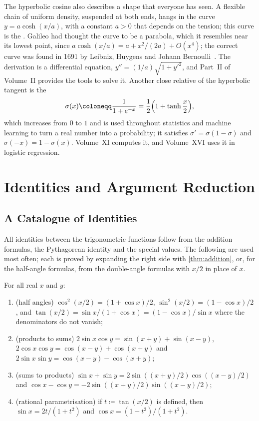 The hyperbolic cosine also describes a shape that everyone has seen. A flexible chain of uniform density, suspended at both ends, hangs in the curve $y=a\cosh(x/a)$, with a constant $a>0$ that depends on the tension; this curve is the . Galileo had thought the curve to be a parabola, which it resembles near its lowest point, since $a\cosh(x/a)=a+x^2/(2a)+O(x^4)$; the correct curve was found in 1691 by Leibniz, Huygens and Johann Bernoulli~\cite{maor1994}. The derivation is a differential equation, $y''=(1/a)\sqrt{1+y'^2}$, and Part~II of Volume~II provides the tools to solve it. Another close relative of the hyperbolic tangent is the 
\[
\sigma(x)\coloneqq\frac1{1+e^{-x}}=\frac12\Bigl(1+\tanh\frac x2\Bigr),
\]
which increases from $0$ to $1$ and is used throughout statistics and machine learning to turn a real number into a probability; it satisfies $\sigma'=\sigma(1-\sigma)$ and $\sigma(-x)=1-\sigma(x)$. Volume~XI computes it, and Volume~XVI uses it in logistic regression.

\section{Identities and Argument Reduction}
\label{sec:identities-reduction}

\subsection{A Catalogue of Identities}

All identities between the trigonometric functions follow from the addition formulas, the Pythagorean identity and the special values. The following are used most often; each is proved by expanding the right side with \cref{thm:addition}, or, for the half-angle formulas, from the double-angle formulas with $x/2$ in place of $x$.

\begin{proposition}
\label{prop:trig-identities}
For all real $x$ and $y$:
\begin{enumerate}
\item (half angles) $\cos^2(x/2)=(1+\cos x)/2$, $\sin^2(x/2)=(1-\cos x)/2$, and $\tan(x/2)=\sin x/(1+\cos x)=(1-\cos x)/\sin x$ where the denominators do not vanish;
\item (products to sums) $2\sin x\cos y=\sin(x+y)+\sin(x-y)$, $2\cos x\cos y=\cos(x-y)+\cos(x+y)$ and $2\sin x\sin y=\cos(x-y)-\cos(x+y)$;
\item (sums to products) $\sin x+\sin y=2\sin((x+y)/2)\cos((x-y)/2)$ and $\cos x-\cos y=-2\sin((x+y)/2)\sin((x-y)/2)$;
\item (rational parametrisation) if $t\coloneqq\tan(x/2)$ is defined, then $\sin x=2t/(1+t^2)$ and $\cos x=(1-t^2)/(1+t^2)$.
\end{enumerate}
\end{proposition}

